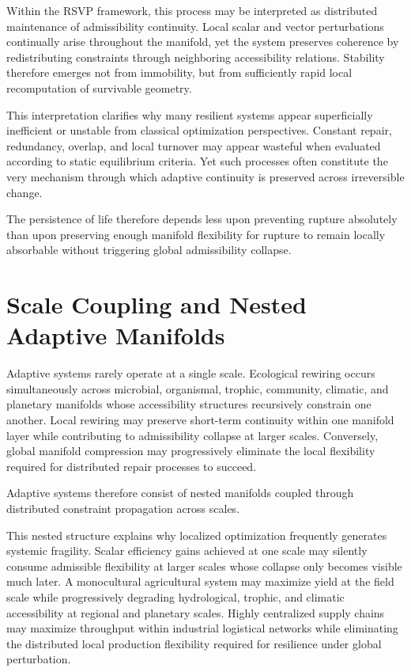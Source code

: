 \documentclass[11pt,a4paper]{article}
\begin{document}
Within the RSVP framework, this process may be interpreted as distributed maintenance of admissibility continuity. Local scalar and vector perturbations continually arise throughout the manifold, yet the system preserves coherence by redistributing constraints through neighboring accessibility relations. Stability therefore emerges not from immobility, but from sufficiently rapid local recomputation of survivable geometry.

This interpretation clarifies why many resilient systems appear superficially inefficient or unstable from classical optimization perspectives. Constant repair, redundancy, overlap, and local turnover may appear wasteful when evaluated according to static equilibrium criteria. Yet such processes often constitute the very mechanism through which adaptive continuity is preserved across irreversible change.

The persistence of life therefore depends less upon preventing rupture absolutely than upon preserving enough manifold flexibility for rupture to remain locally absorbable without triggering global admissibility collapse.

\newpage

\section{Scale Coupling and Nested Adaptive Manifolds}

Adaptive systems rarely operate at a single scale. Ecological rewiring occurs simultaneously across microbial, organismal, trophic, community, climatic, and planetary manifolds whose accessibility structures recursively constrain one another. Local rewiring may preserve short-term continuity within one manifold layer while contributing to admissibility collapse at larger scales. Conversely, global manifold compression may progressively eliminate the local flexibility required for distributed repair processes to succeed.

Adaptive systems therefore consist of nested manifolds coupled through distributed constraint propagation across scales.

This nested structure explains why localized optimization frequently generates systemic fragility. Scalar efficiency gains achieved at one scale may silently consume admissible flexibility at larger scales whose collapse only becomes visible much later. A monocultural agricultural system may maximize yield at the field scale while progressively degrading hydrological, trophic, and climatic accessibility at regional and planetary scales. Highly centralized supply chains may maximize throughput within industrial logistical networks while eliminating the distributed local production flexibility required for resilience under global perturbation.
\end{document}
